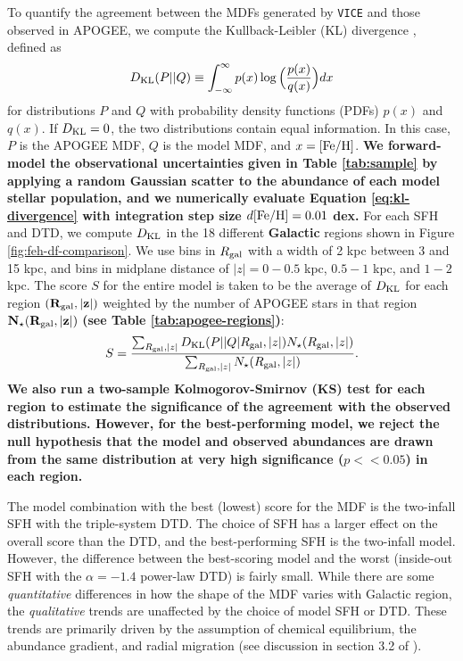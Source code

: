 \documentclass[twocolumn,twocolappendix,linenumbers]{aastex631}
\newcommand{\vice}{{\tt VICE}\xspace}
\begin{document}
To quantify the agreement between the MDFs generated by \vice and those observed in APOGEE, we compute the Kullback-Leibler (KL) divergence \citep{KullbackLeibler1951}, defined as
\begin{equation}
    D_{\rm{KL}}(P||Q) \equiv \int_{-\infty}^{\infty} p(x) \log\Big(\frac{p(x)}{q(x)}\Big) dx
    \label{eq:kl-divergence}
\end{equation}
for distributions $P$ and $Q$ with probability density functions (PDFs) $p(x)$ and $q(x)$. If $D_{\rm KL}=0$, the two distributions contain equal information. In this case, $P$ is the APOGEE MDF, $Q$ is the model MDF, and $x={\rm [Fe/H]}$. {\bf We forward-model the observational uncertainties given in Table \ref{tab:sample} by applying a random Gaussian scatter to the abundance of each model stellar population, and we numerically evaluate Equation \ref{eq:kl-divergence} with integration step size $d{\rm [Fe/H]}=0.01$ dex.}
For each SFH and DTD, we compute $D_{\rm{KL}}$ in the 18 different {\bf Galactic} regions shown in Figure \ref{fig:feh-df-comparison}. We use bins in $R_{\rm gal}$ with a width of 2 kpc between 3 and 15 kpc, and bins in midplane distance of $|z|=0-0.5$ kpc, $0.5-1$ kpc, and $1-2$ kpc. The score $S$ for the entire model is taken to be the average of $D_{\rm{KL}}$ for each region $\bf (R_{\rm gal}, |z|)$
weighted by the number of APOGEE stars in that region $\bf N_\star(R_{\rm gal}, |z|)$ {\bf (see Table \ref{tab:apogee-regions})}:
\begin{equation}
    S = \frac{\sum_{R_{\rm gal}, |z|} D_{\rm KL}(P||Q|R_{\rm gal}, |z|) N_\star(R_{\rm gal}, |z|)}{\sum_{R_{\rm gal}, |z|} N_\star(R_{\rm gal}, |z|)}.
    \label{eq:feh-df-score}
\end{equation}
{\bf We also run a two-sample Kolmogorov-Smirnov (KS) test for each region to estimate the significance of the agreement with the observed distributions. However, for the best-performing model, we reject the null hypothesis that the model and observed abundances are drawn from the same distribution at very high significance ($p<<0.05$) in each region.}

The model combination with the best (lowest) score for the MDF is the two-infall SFH with the triple-system DTD. The choice of SFH has a larger effect on the overall score than the DTD, and the best-performing SFH is the two-infall model. However, the difference between the best-scoring model and the worst (inside-out SFH with the $\alpha=-1.4$ power-law DTD) is fairly small. While there are some {\it quantitative} differences in how the shape of the MDF varies with Galactic region, the {\it qualitative} trends are unaffected by the choice of model SFH or DTD. These trends are primarily driven by the assumption of chemical equilibrium, the abundance gradient, and radial migration (see discussion in section 3.2 of ).
\end{document}
